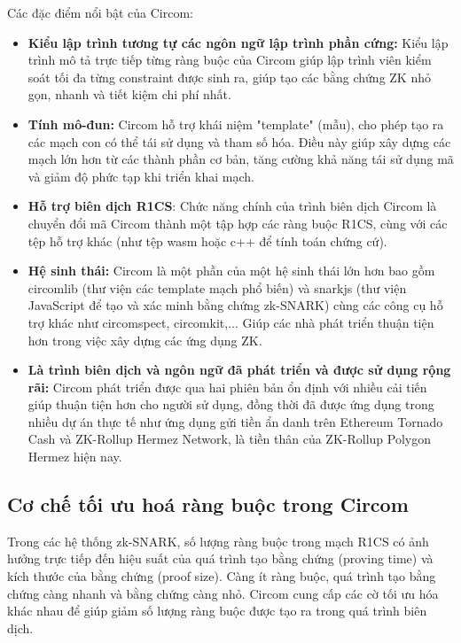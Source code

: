 Các đặc điểm nổi bật của Circom:
\begin{itemize}
    \item \textbf{Kiểu lập trình tương tự các ngôn ngữ lập trình phần cứng:} Kiểu lập trình mô tả trực tiếp từng ràng buộc của Circom giúp lập trình viên kiểm soát tối đa từng constraint được sinh ra, giúp tạo các bằng chứng ZK nhỏ gọn, nhanh và tiết kiệm chi phí nhất.
    \item \textbf{Tính mô-đun:} Circom hỗ trợ khái niệm "template" (mẫu), cho phép tạo ra các mạch con có thể tái sử dụng và tham số hóa. Điều này giúp xây dựng các mạch lớn hơn từ các thành phần cơ bản, tăng cường khả năng tái sử dụng mã và giảm độ phức tạp khi triển khai mạch.
    \item \textbf{Hỗ trợ biên dịch R1CS}: Chức năng chính của trình biên dịch Circom là chuyển đổi mã Circom thành một tập hợp các ràng buộc R1CS, cùng với các tệp hỗ trợ khác (như tệp wasm hoặc c++ để tính toán chứng cứ).
    \item \textbf{Hệ sinh thái:} Circom là một phần của một hệ sinh thái lớn hơn bao gồm circomlib (thư viện các template mạch phổ biến) và snarkjs (thư viện JavaScript để tạo và xác minh bằng chứng zk-SNARK) cùng các công cụ hỗ trợ khác như circomspect, circomkit,... Giúp các nhà phát triển thuận tiện hơn trong việc xây dựng các ứng dụng ZK.
    \item \textbf{Là trình biên dịch và ngôn ngữ đã phát triển và được sử dụng rộng rãi:} Circom phát triển được qua hai phiên bản ổn định với nhiều cải tiến giúp thuận tiện hơn cho người sử dụng, đồng thời đã được ứng dụng trong nhiều dự án thực tế như ứng dụng gửi tiền ẩn danh trên Ethereum Tornado Cash \cite{khovratovich2019tornado} và ZK-Rollup Hermez Network, là tiền thân của ZK-Rollup Polygon Hermez hiện nay.
\end{itemize}

\subsection{Cơ chế tối ưu hoá ràng buộc trong Circom}
\label{Cơ chế tối ưu hoá ràng buộc trong Circom}
Trong các hệ thống zk-SNARK, số lượng ràng buộc trong mạch R1CS có ảnh hưởng trực tiếp đến hiệu suất của quá trình tạo bằng chứng (proving time) và kích thước của bằng chứng (proof size). Càng ít ràng buộc, quá trình tạo bằng chứng càng nhanh và bằng chứng càng nhỏ. Circom cung cấp các cờ tối ưu hóa khác nhau để giúp giảm số lượng ràng buộc được tạo ra trong quá trình biên dịch.

